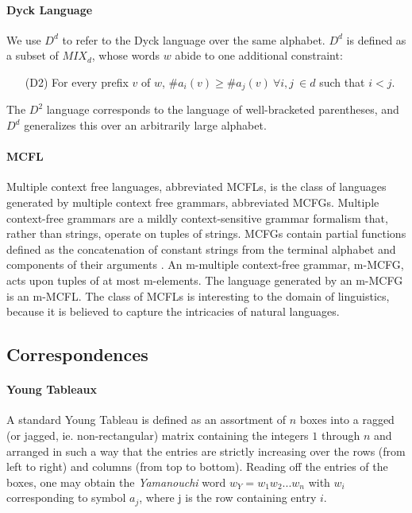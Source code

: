 \documentclass[nonatbib,numbers,10pt]{sigplanconf}
\begin{document}
\paragraph{Dyck Language}
We use $D^d$ to refer to the Dyck language over the same alphabet. $D^d$ is defined as a subset of $MIX_d$, whose words $w$ abide to one additional constraint:
\begin{itemize}
\item[(D2)] For every prefix $v$ of $w$, $ \#a_i(v) \geq \#a_j(v) \ \forall i, j \ \in d$ such that $i < j$.
\end{itemize}

The $D^2$ language corresponds to the language of well-bracketed parentheses, and $D^d$ generalizes this over an arbitrarily large alphabet.
\paragraph{MCFL}
Multiple context free languages, abbreviated MCFLs, is the class of languages generated by multiple context free grammars, abbreviated MCFGs. Multiple context-free grammars are a mildly context-sensitive grammar formalism that, rather than strings, operate on tuples of strings. MCFGs contain partial functions defined as the concatenation of constant strings from the terminal alphabet and components of their arguments \cite{gotzmann}. An m-multiple context-free grammar, m-MCFG, acts upon tuples of at most m-elements. The language generated by an m-MCFG is an m-MCFL. The class of MCFLs is interesting to the domain of linguistics, because it is believed to capture the intricacies of natural languages.

\subsection{Correspondences}
%
\paragraph{Young Tableaux}
A standard Young Tableau is defined as an assortment of $n$ boxes into a ragged (or jagged, ie. non-rectangular) matrix containing the integers $1$ through $n$ and arranged in such a way that the entries are strictly increasing over the rows (from left to right) and columns (from top to bottom). Reading off the entries of the boxes, one may obtain the \textit{Yamanouchi} word $w_Y =w_1 w_2 ... w_n$ with $w_i$ corresponding to symbol $a_j$, where j is the row containing entry $i$.
\end{document}
